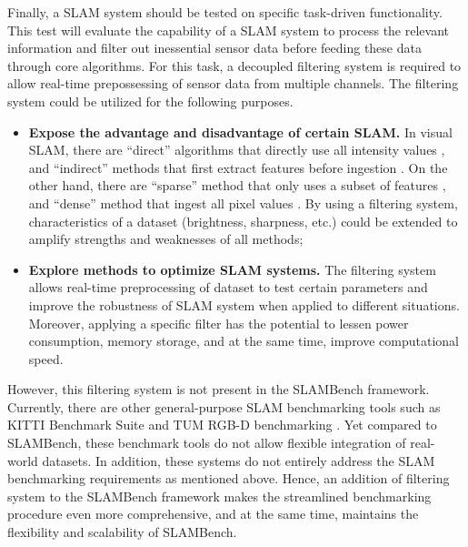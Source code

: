 Finally, a SLAM system should be tested on specific task-driven functionality. 
This test will evaluate the capability of a SLAM system to process the relevant information and filter out inessential sensor data before feeding these data through core algorithms. 
For this task, a decoupled filtering system is required to allow real-time prepossessing of sensor data from multiple channels. 
The filtering system could be utilized for the following purposes.
\begin{itemize}
	\item \textbf{Expose the advantage and disadvantage of certain SLAM.} In visual SLAM, there are “direct” algorithms that directly use all intensity values \cite{newcombe2011kinectfusion}, and “indirect” methods that first extract features before ingestion \cite{davison2007monoslam}. On the other hand, there are “sparse” method that only uses a subset of features \cite{newcombe2011kinectfusion}, and “dense” method that ingest all pixel values \cite{whelan2015elasticfusion}. By using a filtering system, characteristics of a dataset (brightness, sharpness, etc.) could be extended to amplify strengths and weaknesses of all methods;
	\item \textbf{Explore methods to optimize SLAM systems.} The filtering system allows real-time preprocessing of dataset to test certain parameters and improve the robustness of SLAM system when applied to different situations. Moreover, applying a specific filter has the potential to lessen power consumption, memory storage, and at the same time, improve computational speed.
\end{itemize}

However, this filtering system is not present in the SLAMBench framework. 
Currently, there are other general-purpose SLAM benchmarking tools such as KITTI Benchmark Suite \cite{geiger2012we} and TUM RGB-D benchmarking \cite{sturm2012benchmark}. 
Yet compared to SLAMBench, these benchmark tools do not allow flexible integration of real-world datasets. 
In addition, these systems do not entirely address the SLAM benchmarking requirements as mentioned above. 
Hence, an addition of filtering system to the SLAMBench framework makes the streamlined benchmarking procedure even more comprehensive, and at the same time, maintains the flexibility and scalability of SLAMBench. 
